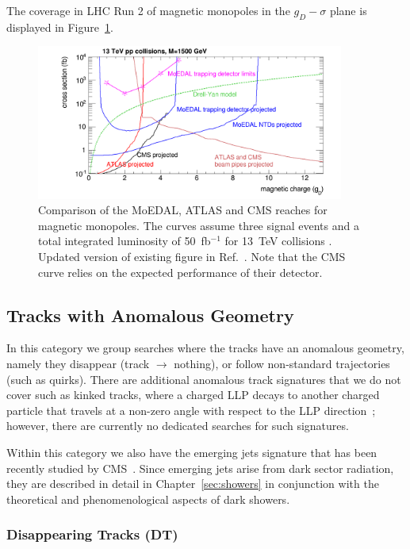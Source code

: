 The coverage in LHC Run 2 of magnetic monopoles in the $g_D-\sigma$ plane is displayed in Figure~\ref{fig:magnetic_monopole_reach}.
%
\begin{figure}[htb]
\centering
\includegraphics[width=0.9\textwidth]{plots/monopoles_xsec_13TeV_3events}
\caption{Comparison of the MoEDAL, ATLAS and CMS reaches for magnetic monopoles. The curves assume three signal events and a total integrated luminosity of 50~fb$^{-1}$ for 13~TeV collisions \cite{mermodpc}. Updated version of existing figure in Ref.~\cite{DeRoeck:2011aa}. Note that the CMS curve relies on the expected performance of their detector.}
\label{fig:magnetic_monopole_reach}
\end{figure}

\subsection{Tracks with Anomalous Geometry}

In this category we group searches where the tracks have an anomalous geometry, namely they disappear (track $\to$ nothing), or follow non-standard trajectories (such as quirks). There are additional anomalous track signatures that we do not cover such as kinked tracks, where a charged LLP decays to another charged particle that travels at a non-zero angle with respect to the LLP direction~\cite{Dimopoulos:1996vz,Hamaguchi:2004df,Asai:2011wy,Jung:2015boa}; however, there are currently no dedicated searches for such signatures.

Within this category we also have the emerging jets signature that has been recently studied by CMS~\cite{Sirunyan:2018njd}. Since emerging jets arise from dark sector radiation, they are described in detail in Chapter~\ref{sec:showers} in conjunction with the theoretical and phenomenological aspects of dark showers.

\subsubsection*{Disappearing Tracks (DT)}

